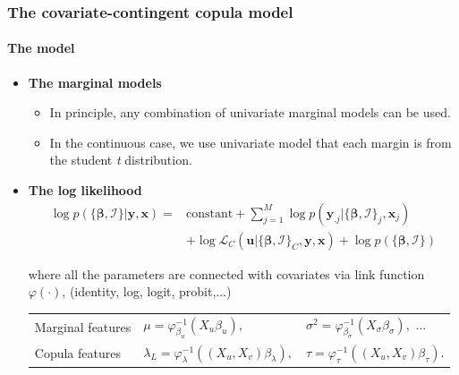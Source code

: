 \documentclass{beamer}
\begin{document}
\begin{frame}
  \frametitle{The covariate-contingent copula model}
  \framesubtitle{The model}
  \begin{itemize}
  \item \textbf{The marginal models}
    \begin{itemize}
    \item In principle, any combination of univariate marginal models can be
      used.
    \item In the continuous case, we use univariate model that each margin is
      from the student \emph{t} distribution.
    \end{itemize}
  \item \textbf{The log likelihood}
\[
\begin{split}\log p(\{\bm{\beta},\bm{\mathcal{I}}\}|\bm{y},\bm{x})= & \mathrm{constant}+\sum\nolimits _{j=1}^{M}\log p(\bm{y}_{.j}|\{\bm{\beta},\bm{\mathcal{I}}\}_{j},\bm{x}_{j})\\
 & +\log\mathcal{L}_{C}(\bm{u}|\{\bm{\beta},\bm{\mathcal{I}}\}_{C},\bm{y},\bm{x})+\log p(\{\bm{\beta},\bm{\mathcal{I}}\})
\end{split}
\]

    where all the parameters are connected with covariates via link function
    $\varphi(\cdot)$, (identity, log, logit, probit,...)
    \begin{center}
      \begin{tabular}{lll}
        Marginal features&$\mu = \varphi_{\beta_u}^{-1}(X_u\beta_u),$
        &$\sigma^2 = \varphi_{\beta_\sigma}^{-1}(X_\sigma\beta_\sigma),$ ... \\
        Copula features&$\lambda_L = \varphi_{\lambda}^{-1}((X_u,X_v)\beta_\lambda),$& $\tau = \varphi_{\tau}^{-1}((X_u,X_v)\beta_\tau).$ \\
      \end{tabular}
    \end{center}
  \end{itemize}
\end{frame}
\end{document}
